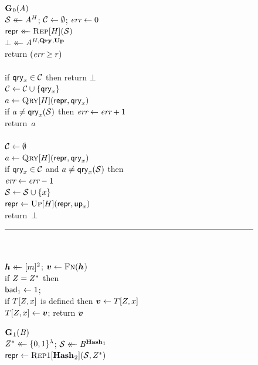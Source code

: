 \begin{figure}
  {
    \underline{$\mathbf{G}\hspace{0.5pt}_0(\mathit{A})$}\\[2pt]
      $\mathcal{S} \mathrel{\leftarrow\mkern-14mu\leftarrow} \mathit{A}^H$; $\mathcal{C} \gets \emptyset$; $\textit{err} \gets 0$\\
      $\mathsf{repr} \mathrel{\leftarrow\mkern-14mu\leftarrow} \textsc{Rep}[H](\mathcal{S})$\\
      $\bot \mathrel{\leftarrow\mkern-14mu\leftarrow} \mathit{A}^{H,\mathbf{Qry}\hspace{0.5pt},\mathbf{Up}\hspace{0.5pt}}$\\
      return $(\textit{err} \geq r)$
    \\[6pt]
    \\[2pt]
      if $\mathsf{qry}_x \in \mathcal{C}$ then return $\bot$\\
      $\mathcal{C} \gets \mathcal{C} \cup \{\mathsf{qry}_x\}$\\
      $a \gets \textsc{Qry}[H](\mathsf{repr}, \mathsf{qry}_x)$\\
      if $a \neq \mathsf{qry}_x(\mathcal{S})$ then $\textit{err} \gets \textit{err} + 1$\\
      return~$a$
    \\[6pt]
    \\[2pt]
      $\mathcal{C} \gets \emptyset$\\
      $a \gets \textsc{Qry}[H](\mathsf{repr}, \mathsf{qry}_x)$\\
      if $\mathsf{qry}_x \in \mathcal{C}$ and $a \neq \mathsf{qry}_x(\mathcal{S})$ then\\
      \tab $\textit{err} \gets \textit{err}-1$\\
      $\mathcal{S} \gets \mathcal{S} \cup \{x\}$\\
      $\mathsf{repr} \gets \textsc{Up}[H](\mathsf{repr},\mathsf{up}_x)$\\
      return~$\bot$
    \\[4pt]
    \hspace*{-4pt}\rule{1.043\textwidth}{.4pt}
    \\[5pt]
     \hfill{}\hspace*{3pt}\\
      $\hh \getsr [m]^2$; $\vv \gets \fff(\hh$)\\
      if $Z = Z^*$ then\\
      \tab $\mathsf{bad}_1 \gets 1$; \\
      if $T[Z,x]$ is defined then $\vv \gets T[\salt,x]$\\
      $T[\salt,x] \gets \vv$;
      return $\vv$
  }
  {
    \underline{$\mathbf{G}\hspace{0.5pt}_1(\mathit{B})$}\\[2pt]
      $Z^* \mathrel{\leftarrow\mkern-14mu\leftarrow} \{0,1\}^\lambda$;
      $\mathcal{S} \mathrel{\leftarrow\mkern-14mu\leftarrow} \mathit{B}^{\mathbf{Hash}\hspace{0.5pt}_1}$\\
      $\mathsf{repr} \gets \textsc{Rep}1[\mathbf{Hash}\hspace{0.5pt}_2](\mathcal{S}, Z^*)$\\
}
\end{figure}

